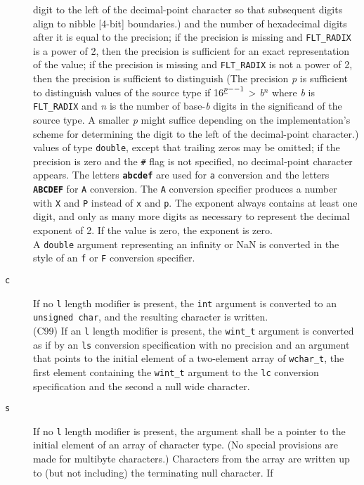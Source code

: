 \begin{description}
digit to the left of the decimal-point character so that subsequent digits
align to nibble [4-bit] boundaries.) and the number of hexadecimal digits after
it is equal to the precision; if the precision is missing and
\texttt{FLT\_RADIX} is a power of 2, then the precision is sufficient for an
exact representation of the value; if the precision is missing and
\texttt{FLT\_RADIX} is not a power of 2, then the precision is sufficient to
distinguish (The precision \emph{p} is sufficient to distinguish values of the
source type if 16\(^{\emph{p}--1}\) \textgreater{} \emph{b\(^{n}\)} where
\emph{b} is \texttt{FLT\_RADIX} and \emph{n} is the number of base-\emph{b}
digits in the significand of the source type. A smaller \emph{p} might suffice
depending on the implementation's scheme for determining the digit to the left
of the decimal-point character.) values of type \texttt{double}, except that
trailing zeros may be omitted; if the precision is zero and the \texttt{\#}
flag is not specified, no decimal-point character appears. The letters
\texttt{\textbf{abcdef}} are used for \texttt{a} conversion and the letters
\texttt{\textbf{ABCDEF}} for \texttt{A} conversion. The \texttt{A} conversion
specifier produces a number with \texttt{X} and \texttt{P} instead of
\texttt{x} and \texttt{p}. The exponent always contains at least one digit, and
only as many more digits as necessary to represent the decimal exponent of 2.
If the value is zero, the exponent is zero.\\A \texttt{double} argument
representing an infinity or NaN is converted in the style of an \texttt{f} or
\texttt{F} conversion specifier.
	\item[\texttt{c}] If no \texttt{l} length modifier is present, the
\texttt{int} argument is converted to an \texttt{unsigned char}, and the
resulting character is written.\\(C99) If an \texttt{l} length modifier is
present, the \texttt{wint\_t} argument is converted as if by an \texttt{ls}
conversion specification with no precision and an argument that points to the
initial element of a two-element array of \texttt{wchar\_t}, the first element
containing the \texttt{wint\_t} argument to the \texttt{lc} conversion
specification and the second a null wide character.
	\item[\texttt{s}] If no \texttt{l} length modifier is present, the argument
shall be a pointer to the initial element of an array of character type. (No
special provisions are made for multibyte characters.) Characters from the
array are written up to (but not including) the terminating null character. If

\end{description}

